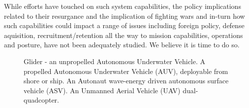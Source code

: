 \documentclass[10pt,letterpaper]{article}
\begin{document}
While \org efforts have touched on such system capabilities, the
policy implications related to their resurgance and the implication of
fighting wars and in-turn how such capabilities could impact a range
of issues including foreign policy, defense aquisition,
recruitment/retention all the way to mission capabilities, operations
and posture, have not been adequately studied. We believe it is time
to do so. 
 
\begin{figure}[h!]
\centering
\vspace{-0.3in}
\caption{  Glider - an unpropelled Autonomous
  Underwater Vehicle.   A propelled Autonomous
  Underwater Vehicle (AUV), deployable from shore or ship.
   An Autonaut wave-energy driven autonomous surface
  vehicle (ASV).  
   An Unmanned Aerial Vehicle (UAV) dual-quadcopter.}
\label{fig:systems}
\end{figure}
\end{document}
